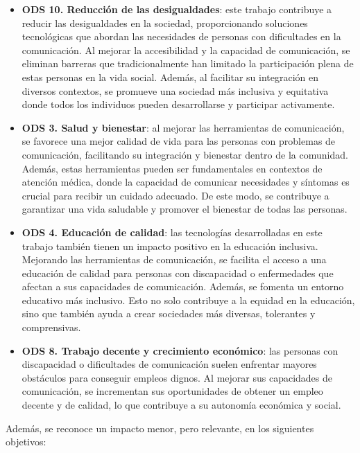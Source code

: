 \documentclass[11pt]{article}
\begin{document}
\begin{itemize}
	\item \textbf{ODS 10. Reducción de las desigualdades}: este trabajo contribuye a reducir las desigualdades en la sociedad, proporcionando soluciones tecnológicas que abordan las necesidades de personas con dificultades en la comunicación. Al mejorar la accesibilidad y la capacidad de comunicación, se eliminan barreras que tradicionalmente han limitado la participación plena de estas personas en la vida social. Además, al facilitar su integración en diversos contextos, se promueve una sociedad más inclusiva y equitativa donde todos los individuos pueden desarrollarse y participar activamente.
	\item \textbf{ODS 3. Salud y bienestar}: al mejorar las herramientas de comunicación, se favorece una mejor calidad de vida para las personas con problemas de comunicación, facilitando su integración y bienestar dentro de la comunidad. Además, estas herramientas pueden ser fundamentales en contextos de atención médica, donde la capacidad de comunicar necesidades y síntomas es crucial para recibir un cuidado adecuado. De este modo, se contribuye a garantizar una vida saludable y promover el bienestar de todas las personas.
	\item \textbf{ODS 4. Educación de calidad}: las tecnologías desarrolladas en este trabajo también tienen un impacto positivo en la educación inclusiva. Mejorando las herramientas de comunicación, se facilita el acceso a una educación de calidad para personas con discapacidad o enfermedades que afectan a sus capacidades de comunicación. Además, se fomenta un entorno educativo más inclusivo. Esto no solo contribuye a la equidad en la educación, sino que también ayuda a crear sociedades más diversas, tolerantes y comprensivas.
	\item \textbf{ODS 8. Trabajo decente y crecimiento económico}: las personas con discapacidad o dificultades de comunicación suelen enfrentar mayores obstáculos para conseguir empleos dignos. Al mejorar sus capacidades de comunicación, se incrementan sus oportunidades de obtener un empleo decente y de calidad, lo que contribuye a su autonomía económica y social.
\end{itemize}

Además, se reconoce un impacto menor, pero relevante, en los siguientes objetivos:
\end{document}
